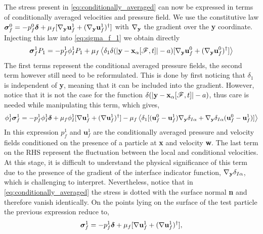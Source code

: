 The stress present in \ref{eq:conditionally_averaged} can now be expressed in terms of conditionally averaged velocities and pressure field. 
We use the constitutive law $\bm\sigma_f^0 = -p_f^0 \bm\delta + \mu_f [{\mathbf{\nabla}_\textbf{y}} \textbf{u}_f^1+ ({\mathbf{\nabla}_\textbf{y}} \textbf{u}_f^1)^\dagger]$ with ${\mathbf{\nabla}_\textbf{y}}$ the gradient over the \textbf{y} coordinate.
Injecting this law into \ref{eq:sigma_f_1} we obtain directly 
\begin{equation*}
    \bm\sigma^1_f
    P_1
    = 
    - p^1_f
    \phi_I^1
    P_1
    + \mu_f \left<
        \delta_1
        \delta(|\textbf{y} - \textbf{x}_\alpha[\mathscr{F},t]|-a)
        [
            {\mathbf{\nabla}_\textbf{y}} \textbf{u}_f^0
            + ({\mathbf{\nabla}_\textbf{y}} \textbf{u}_f^0)^\dagger
        ]
        \right>
\end{equation*}
The first terms represent the conditional averaged pressure fields, the second term however still need to be reformulated. 
This is done by first noticing that $\delta_1$ is independent of \textbf{y}, meaning that it can be included into the gradient. 
However, notice that it is not the case for the function $\delta(|\textbf{y} - \textbf{x}_\alpha[\mathscr{F},t]|-a)$, thus care is needed while manipulating this term, which gives,
\begin{equation*}
    \phi_I^1 \bm\sigma_f^1
    = - p_f^1 \phi_I^1 \bm\delta
    +\mu_f \phi_I^1 [\mathbf{\nabla} \textbf{u}_f^1+(\mathbf{\nabla} \textbf{u}_f^1)^\dagger]
    - \mu_f\left<
        \delta_1
        [(\textbf{u}_f^0 - \textbf{u}_f^1){\mathbf{\nabla}_\textbf{y}} \delta_{I\alpha}
        + {\mathbf{\nabla}_\textbf{y}} \delta_{I\alpha} (\textbf{u}_f^0 - \textbf{u}_f^1)]
    \right>
    \label{eq:stress_final}
\end{equation*}
In this expression $p_f^1$ and $\textbf{u}_f^1$ are the conditionally averaged pressure and velocity fields conditioned on the presence of a particle at \textbf{x} and velocity \textbf{w}. 
The last term on the RHS represent the fluctuation between the local and conditional velocities. 
At this stage, it is difficult to understand the physical significance of this term due to the presence of the gradient of the interface indicator function, ${\mathbf{\nabla}_\textbf{y}} \delta_{I\alpha}$, which is challenging to interpret. 
Nevertheless, notice that in \ref{eq:conditionally_averaged} the stress is dotted with the surface normal \textbf{n} and therefore vanish identically. 
On the points lying on the surface of the test particle the previous expression reduce to, 
\begin{equation*}
    \bm\sigma_f^1
    = - p_f^1 \bm\delta
    +\mu_f [\mathbf{\nabla} \textbf{u}_f^1+(\mathbf{\nabla} \textbf{u}_f^1)^\dagger], 
\end{equation*}
